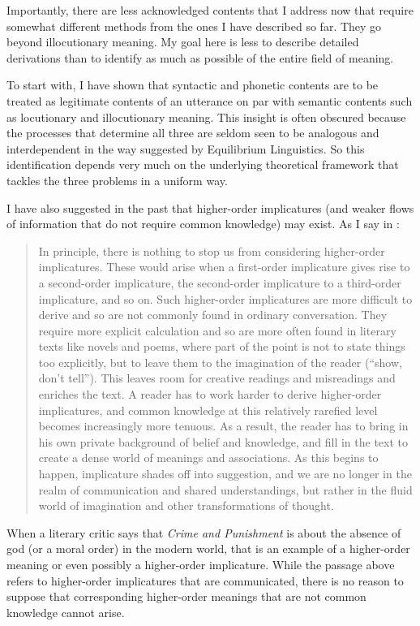 Importantly, there are less acknowledged contents that I address now that require somewhat different methods from the ones I have described so far. They go beyond illocutionary meaning. My goal here is less to describe detailed derivations than to identify as much as possible of the entire field of meaning.

To start with, I have shown that syntactic and phonetic contents are to be treated as legitimate contents of an utterance on par with semantic contents such as locutionary and illocutionary meaning. This insight is often obscured because the processes that determine all three are seldom seen to be analogous and interdependent in the way suggested by Equilibrium Linguistics. So this identification depends very much on the underlying theoretical framework that tackles the three problems in a uniform way.

I have also suggested in the past that higher-order implicatures (and weaker flows of information that do not require common knowledge) may exist. As I say in \citet[Section~7.9]{parikh:ul}:

\begin{quote}
\label{quote:association}
In principle, there is nothing to stop us from considering
higher-order implicatures.  These would arise when a first-order
implicature gives rise to a second-order implicature, the second-order
implicature to a third-order implicature, and so on.  Such higher-order
implicatures are more difficult to derive and so are not commonly found
in ordinary conversation.  They require more explicit calculation and
so are more often found in literary texts like novels and poems, 
where part of the point is not to state things too explicitly, but to
leave them to the imagination of the reader (``show, don't tell'').  This leaves room
for creative readings and misreadings and enriches the text.  A reader has to work harder to derive
higher-order implicatures, and common knowledge at this relatively
rarefied level becomes increasingly more tenuous.  As a result, the reader
has to bring in his own private background of belief and knowledge, and
fill in the text to create a dense world of meanings and associations.  As this
begins to happen, implicature shades off into suggestion, and
we are no longer in the realm of communication and shared understandings, but
rather in the fluid world of imagination and other transformations of
thought.
\end{quote}

When a literary critic says that \emph{Crime and Punishment} is about the absence of god (or a moral order) in the modern world, that is an example of a higher-order meaning or even possibly a higher-order implicature. While the passage above refers to higher-order implicatures that are communicated, there is no reason to suppose that corresponding higher-order meanings that are not common knowledge cannot arise.

